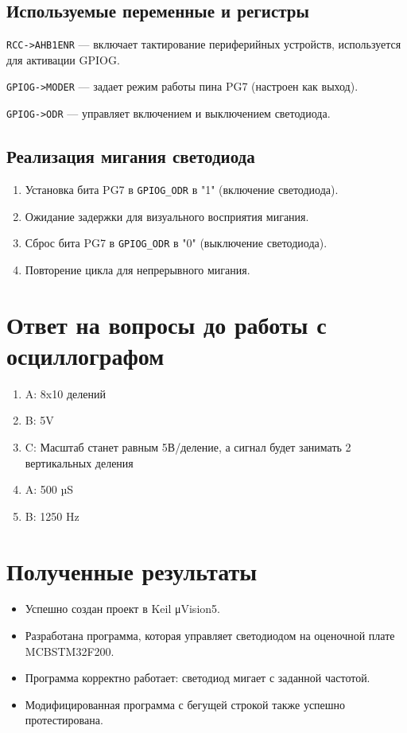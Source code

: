\documentclass[a4paper, final]{article}
\begin{document}
\subsection{Используемые переменные и регистры}
\begin{description}
    \item \texttt{RCC->AHB1ENR} — включает тактирование периферийных устройств, используется для активации GPIOG.
    \item \texttt{GPIOG->MODER} — задает режим работы пина PG7 (настроен как выход).
    \item \texttt{GPIOG->ODR} — управляет включением и выключением светодиода.
\end{description}

\subsection{Реализация мигания светодиода}
\begin{enumerate}
    \item Установка бита PG7 в \texttt{GPIOG\_ODR} в "1" (включение светодиода).
    \item Ожидание задержки для визуального восприятия мигания.
    \item Сброс бита PG7 в \texttt{GPIOG\_ODR} в "0" (выключение светодиода).
    \item Повторение цикла для непрерывного мигания.
\end{enumerate}

\section{Ответ на вопросы до работы с осциллографом}
\begin{enumerate}
	\item A: 8x10 делений
	\item B: 5V
	\item C: Масштаб станет равным 5В/деление, а сигнал будет занимать 2 вертикальных деления
	\item A: 500 µS
	\item B: 1250 Hz
\end{enumerate}

\section{Полученные результаты}
\begin{itemize}
	\item Успешно создан проект в Keil μVision5.
	\item Разработана программа, которая управляет светодиодом на оценочной плате MCBSTM32F200.
	\item Программа корректно работает: светодиод мигает с заданной частотой.
	\item Модифицированная программа с бегущей строкой также успешно протестирована.
\end{itemize}
\end{document}
